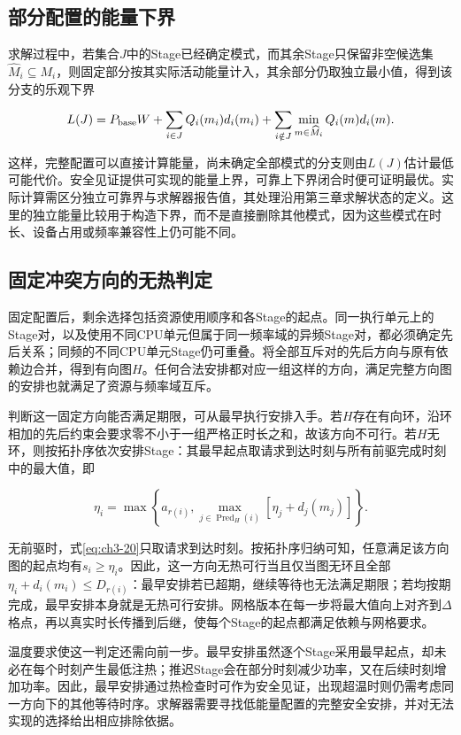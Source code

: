 
\subsection{部分配置的能量下界}

求解过程中，若集合\(J\)中的Stage已经确定模式，而其余Stage只保留非空候选集\(\widehat M_i\subseteq M_i\)，则固定部分按其实际活动能量计入，其余部分仍取独立最小值，得到该分支的乐观下界

\begin{equation}
L(J)=P_{\rm base}W+\sum_{i\in J}Q_i(m_i)d_i(m_i)
+\sum_{i\notin J}\min_{m\in\widehat M_i}Q_i(m)d_i(m).
\label{eq:ch3-19}
\end{equation}

这样，完整配置可以直接计算能量，尚未确定全部模式的分支则由\(L(J)\)估计最低可能代价。安全见证提供可实现的能量上界，可靠上下界闭合时便可证明最优。实际计算需区分独立可靠界与求解器报告值，其处理沿用第三章求解状态的定义。这里的独立能量比较用于构造下界，而不是直接删除其他模式，因为这些模式在时长、设备占用或频率兼容性上仍可能不同。

\subsection{固定冲突方向的无热判定}

固定配置后，剩余选择包括资源使用顺序和各Stage的起点。同一执行单元上的Stage对，以及使用不同CPU单元但属于同一频率域的异频Stage对，都必须确定先后关系；同频的不同CPU单元Stage仍可重叠。将全部互斥对的先后方向与原有依赖边合并，得到有向图\(H\)。任何合法安排都对应一组这样的方向，满足完整方向图的安排也就满足了资源与频率域互斥。

判断这一固定方向能否满足期限，可从最早执行安排入手。若\(H\)存在有向环，沿环相加的先后约束会要求零不小于一组严格正时长之和，故该方向不可行。若\(H\)无环，则按拓扑序依次安排Stage：其最早起点取请求到达时刻与所有前驱完成时刻中的最大值，即

\begin{equation}
\eta_i=\max\left\{a_{r(i)},\max_{j\in\operatorname{Pred}_H(i)}[\eta_j+d_j(m_j)]\right\}.
\label{eq:ch3-20}
\end{equation}

无前驱时，式\eqref{eq:ch3-20}只取请求到达时刻。按拓扑序归纳可知，任意满足该方向图的起点均有\(s_i\ge\eta_i\)。因此，这一方向无热可行当且仅当图无环且全部\(\eta_i+d_i(m_i)\le D_{r(i)}\)：最早安排若已超期，继续等待也无法满足期限；若均按期完成，最早安排本身就是无热可行安排。网格版本在每一步将最大值向上对齐到\(\Delta\)格点，再以真实时长传播到后继，使每个Stage的起点都满足依赖与网格要求。

温度要求使这一判定还需向前一步。最早安排虽然逐个Stage采用最早起点，却未必在每个时刻产生最低注热；推迟Stage会在部分时刻减少功率，又在后续时刻增加功率。因此，最早安排通过热检查时可作为安全见证，出现超温时则仍需考虑同一方向下的其他等待时序。求解器需要寻找低能量配置的完整安全安排，并对无法实现的选择给出相应排除依据。
